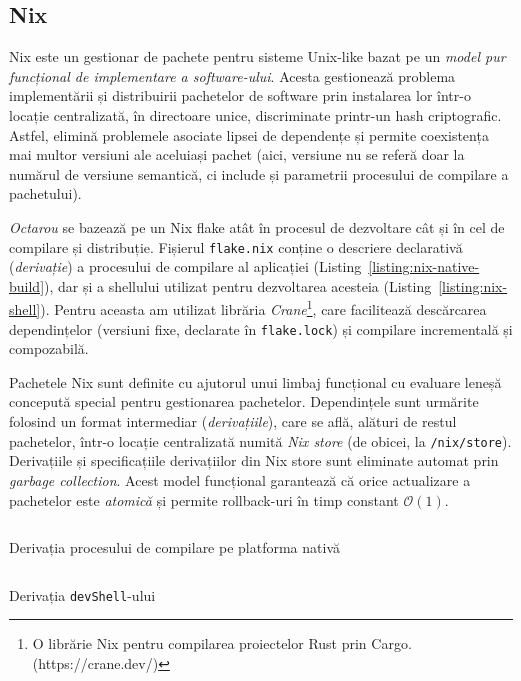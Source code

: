 \documentclass[a4paper]{article}
\begin{document}
\subsection{Nix}
Nix este un gestionar de pachete pentru sisteme Unix-like bazat pe un \textit{model pur funcțional de implementare a software-ului}\cite{edolstra}.
Acesta gestionează problema implementării și distribuirii pachetelor de software prin instalarea lor într-o locație centralizată, în directoare
unice, discriminate printr-un hash criptografic. Astfel, elimină problemele asociate lipsei de dependențe și permite coexistența mai multor
versiuni ale aceluiași pachet (aici, versiune nu se referă doar la numărul de versiune semantică, ci include și parametrii procesului de compilare 
a pachetului).

\textit{Octarou} se bazează pe un Nix flake atât în procesul de dezvoltare cât și în cel de compilare și distribuție. Fișierul \texttt{flake.nix} conține
o descriere declarativă (\textit{derivație}) a procesului de compilare al aplicației (Listing~\ref{listing:nix-native-build}), dar și a shellului utilizat
pentru dezvoltarea acesteia (Listing~\ref{listing:nix-shell}). Pentru aceasta am
utilizat librăria \textit{Crane}\footnote[1]{O librărie Nix pentru compilarea proiectelor Rust prin Cargo. (https://crane.dev/)}, care facilitează
descărcarea dependințelor (versiuni fixe, declarate în \texttt{flake.lock}) și compilare incrementală și compozabilă.

Pachetele Nix sunt definite cu ajutorul unui limbaj funcțional cu evaluare leneșă concepută special pentru gestionarea pachetelor. Dependințele
sunt urmărite folosind un format intermediar (\textit{derivațiile}), care se află, alături de restul pachetelor, într-o locație centralizată numită
\textit{Nix store} (de obicei, la \texttt{/nix/store}). Derivațiile și specificațiile derivațiilor din Nix store sunt eliminate automat prin
\textit{garbage collection}. Acest model funcțional garantează că orice actualizare a pachetelor este \textit{atomică} și permite rollback-uri
în timp constant\cite{edolstra} $\mathcal{O}(1)$.

\begin{listing}
  \inputminted{nix}{codeblocks/octarou-package.nix}
  \caption{Derivația procesului de compilare pe platforma nativă}
  \label{listing:nix-native-build}
\end{listing}

\begin{listing}
  \inputminted{nix}{codeblocks/octarou-devshell.nix}
  \caption{Derivația \texttt{devShell}-ului}
  \label{listing:nix-shell}
\end{listing}
\end{document}
